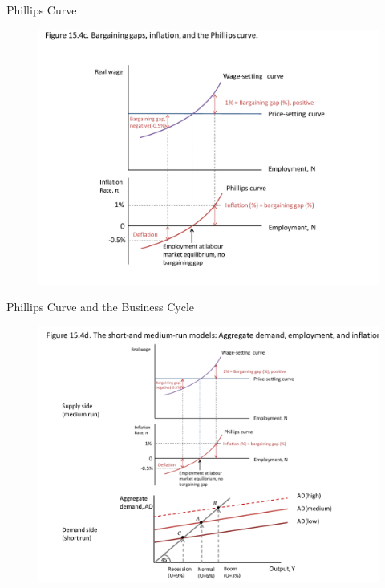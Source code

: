 \documentclass[11pt,aspectratio=43,usenames,dvipsnames]{beamer}
\theoremstyle{definition}
\begin{document}
\begin{frame}{Phillips Curve}
\label{slide:Phillips_Curve}
    \begin{figure}
        \centering
        \includegraphics[width=.9\textwidth]{./figures/6.pdf}
    \end{figure}

\end{frame}

\begin{frame}{Phillips Curve and the Business Cycle}
\label{slide:Phillips_Curve_and_the_Business_Cycle}
    \begin{center}
    \end{center}
    \begin{figure}
        \centering
        \includegraphics[width=.8\textwidth]{./figures/7.pdf}
    \end{figure}
\end{frame}
\end{document}
